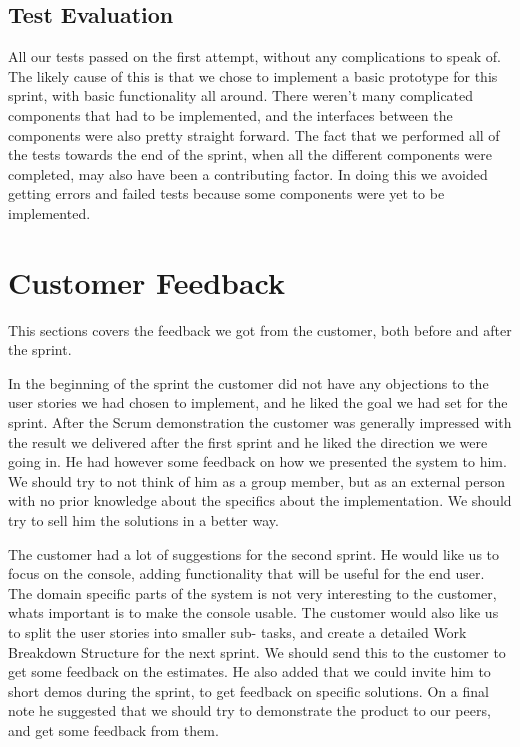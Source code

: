 \subsection{Test Evaluation}
All our tests passed on the first attempt, without any complications to speak of. The likely cause of this is that we chose to implement a basic prototype for this sprint, with basic functionality all around. There weren't many complicated components that had to be implemented, and the interfaces between the components were also pretty straight forward. The fact that we performed all of the tests towards the end of the sprint, when all the different components were completed, may also have been a contributing factor. In doing this we avoided getting errors and failed tests because some components were yet to be implemented.

\section{Customer Feedback}
This sections covers the feedback we got from the customer, both before and after the sprint.

In the beginning of the sprint the customer did not have any objections to the user stories we had chosen to implement, and he liked the goal we had set for the sprint. After the Scrum demonstration the customer was generally impressed with the result we delivered after the first sprint and he liked the direction we were going in. He had however some feedback on how we presented the system to him. We should try to not think of him as a group member, but as an external person with no prior knowledge about the specifics about the implementation. We should try to sell him the solutions in a better way.

The customer had a lot of suggestions for the second sprint. He would like us to focus on the console, adding functionality that will be useful for the end user. The domain specific parts of the system is not very interesting to the customer, whats important is to make the console usable. The customer would also like us to split the user stories into smaller sub- tasks, and create a detailed Work Breakdown Structure for the next sprint. We should send this to the customer to get some feedback on the estimates. He also added that we could invite him to short demos during the sprint, to get feedback on specific solutions. On a final note he suggested that we should try to demonstrate the product to our peers, and get some feedback from them.



